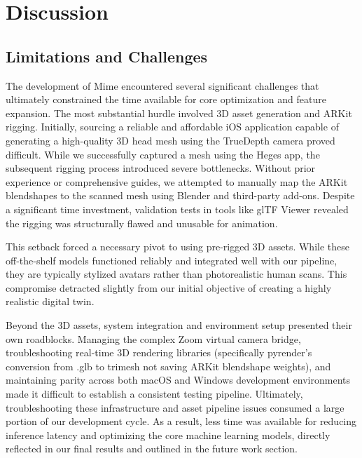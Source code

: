 \chapter{Discussion}

\section{Limitations and Challenges}

The development of Mime encountered several significant challenges that ultimately constrained the time available for core optimization and feature expansion. The most substantial hurdle involved 3D asset generation and ARKit rigging. Initially, sourcing a reliable and affordable iOS application capable of generating a high-quality 3D head mesh using the TrueDepth camera proved difficult. While we successfully captured a mesh using the Heges app, the subsequent rigging process introduced severe bottlenecks. Without prior experience or comprehensive guides, we attempted to manually map the ARKit blendshapes to the scanned mesh using Blender and third-party add-ons. Despite a significant time investment, validation tests in tools like glTF Viewer revealed the rigging was structurally flawed and unusable for animation.

This setback forced a necessary pivot to using pre-rigged 3D assets. While these off-the-shelf models functioned reliably and integrated well with our pipeline, they are typically stylized avatars rather than photorealistic human scans. This compromise detracted slightly from our initial objective of creating a highly realistic digital twin.

Beyond the 3D assets, system integration and environment setup presented their own roadblocks. Managing the complex Zoom virtual camera bridge, troubleshooting real-time 3D rendering libraries (specifically pyrender's conversion from .glb to trimesh not saving ARKit blendshape weights), and maintaining parity across both macOS and Windows development environments made it difficult to establish a consistent testing pipeline. Ultimately, troubleshooting these infrastructure and asset pipeline issues consumed a large portion of our development cycle. As a result, less time was available for reducing inference latency and optimizing the core machine learning models, directly reflected in our final results and outlined in the future work section.

